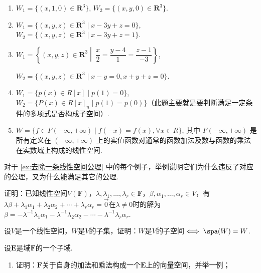 \begin{exercise}
\begin{exgroup}
\begin{enumerate}
            \item $W_1 = \{(x,1,0) \in \mathbf{R}^3 \}$, $W_2 = \{(x,y,0) \in \mathbf{R}^3\}$.

            \item $W_1 = \{(x,y,z) \in \mathbf{R}^3 \mid x-3y+z = 0\}$, $W_2 = \{(x,y,z) \in \mathbf{R}^3 \mid x-3y+z = 1\}$.

            \item $W_1 = \left\{(x,y,z) \in \mathbf{R}^3 \middle|\ \dfrac{x}{2} = \dfrac{y-4}{1} = \dfrac{z-1}{-3}\right\}$,

                  $W_2 = \{(x,y,z) \in \mathbf{R}^3 \mid x-y = 0, x+y+z = 0\}$.

            \item $W_1 = \{p(x) \in R[x] \mid p(1) = 0\}$, $W_2 = \{P(x) \in R[x]_n \mid p(1) = p(0)\}$（此题主要就是要判断满足一定条件的多项式是否构成子空间）.

            \item $W = \{f \in F(-\infty, +\infty) \mid f(-x)=f(x), \forall x \in R\}$, 其中 $F(-\infty, +\infty)$ 是所有定义在 $(-\infty, +\infty)$ 上的实值函数对通常的函数加法及数与函数的乘法在实数域上构成的线性空间.

        \end{enumerate}

        \item 对于 \autoref{ex:去除一条线性空间公理} 中的每个例子，举例说明它们为什么违反了对应的公理，又为什么能满足其它的公理.
    \end{exgroup}

    \begin{exgroup}
        \item 证明：已知线性空间$V(\mathbf{F})$，$\lambda,\lambda_1,\ldots,\lambda_r\in\mathbf{F}$，$\beta,\alpha_1,\ldots,\alpha_r\in V$，有$\lambda\beta+\lambda_1\alpha_1+\lambda_2\alpha_2+\cdots+\lambda_r\alpha_r=\vec{0}$在$\lambda\neq 0$时的解为$\beta=-\lambda^{-1}\lambda_1\alpha_1-\lambda^{-1}\lambda_2\alpha_2-\cdots-\lambda^{-1}\lambda_r\alpha_r$.

        \item 设$V$是一个线性空间，$W$是$V$的子集，证明：$W$是$V$的子空间$\iff \spa(W)=W$.
    \end{exgroup}

    \begin{exgroup}
        \item 设$\mathbf{E}$是域$\mathbf{F}$的一个子域.
        \begin{enumerate}
            \item 证明：$\mathbf{F}$关于自身的加法和乘法构成一个$\mathbf{E}$上的向量空间，并举一例；


\end{enumerate}
\end{exgroup}
\end{exercise}
